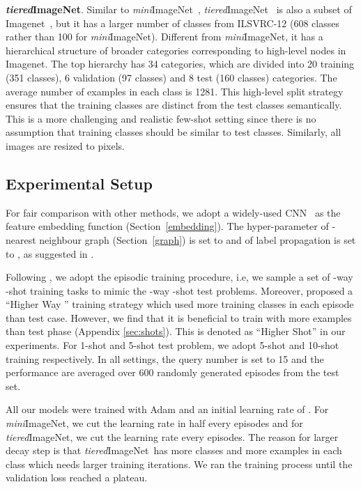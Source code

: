 \documentclass{article} \usepackage{iclr2019_conference,times}
\def\mini{{\textit{mini}ImageNet}}
\def\tiered{{\textit{tiered}ImageNet}}
\begin{document}
\textbf{\tiered}. Similar to \mini~, \tiered~\citep{semi-proto} is also a subset of Imagenet~\citep{imagenet}, but it has a larger number of classes from ILSVRC-12 (608 classes rather than 100 for \mini). Different from \mini, it has a hierarchical structure of broader categories corresponding to high-level nodes in Imagenet. The top hierarchy has 34 categories, which are divided into 20 training (351 classes), 6 validation (97 classes) and 8 test (160 classes) categories. 
The average number of examples in each class is 1281.
This high-level split strategy ensures that the training classes are distinct from the test classes semantically. This is a more challenging and realistic few-shot setting since there is no assumption that training classes should be similar to test classes. Similarly, all images are resized to  pixels.

\subsection{Experimental Setup}
For fair comparison with other methods, we adopt a widely-used CNN~\citep{maml,prototypical} as the feature embedding function  (Section~\ref{embedding}). 
The hyper-parameter  of -nearest neighbour graph (Section~\ref{graph}) is set to  and  of label propagation is set to , as suggested in \cite{labelprop1}.


Following \cite{prototypical}, we adopt the episodic training procedure, i.e, we sample a set of -way -shot training tasks to mimic the -way -shot test problems. Moreover, \cite{prototypical} proposed a ``Higher Way '' training strategy which used more training classes in each episode than test case. However, we find that it is beneficial to train with more examples than test phase (Appendix \ref{sec:shots}). This is denoted as ``Higher Shot'' in our experiments. For 1-shot and 5-shot test problem, we adopt 5-shot and 10-shot training respectively. In all settings, the query number is set to 15 and the performance are averaged over 600 randomly generated episodes from the test set. 

All our models were trained with Adam \citep{adam} and an initial learning rate of . For \mini, we cut the learning rate in half every  episodes and for \tiered, we cut the learning rate every  episodes. The reason for larger decay step is that \tiered~has more classes and more examples in each class which needs larger training iterations. We ran the training process until the validation loss reached a plateau.
\end{document}
